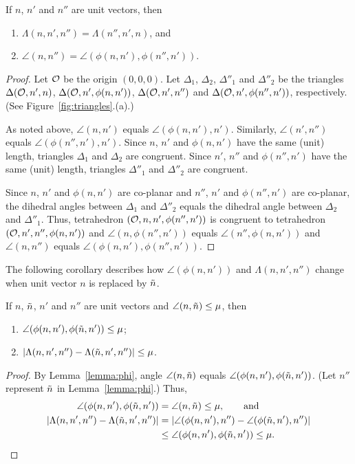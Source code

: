\begin{lemma}
If $n$, $n'$ and $n''$ are unit vectors, then
\begin{enumerate}
\item $\Lambda(n,n',n'') = \Lambda(n'',n',n)$, and
\item $\angle(n,n'') = \angle(\phi(n,n'),\phi(n'',n'))$.
\end{enumerate}
\label{lemma:phi}
\end{lemma}

\begin{proof}
Let $\mathcal{O}$ be the origin $(0,0,0)$.
Let $\Delta_1$, $\Delta_2$, $\Delta''_1$ and $\Delta''_2$
be the triangles $\Delta(\mathcal{O},n',n)$, $\Delta(\mathcal{O},n',\phi(n,n'))$,
$\Delta(\mathcal{O},n',n'')$ and $\Delta(\mathcal{O},n',\phi(n'',n'))$, respectively.
(See Figure~\ref{fig:triangles}.(a).)

As noted above, $\angle(n,n')$ equals $\angle(\phi(n,n'),n')$.
Similarly, $\angle(n',n'')$ equals $\angle(\phi(n'',n'), n')$.
Since $n$, $n'$ and  $\phi(n,n')$ have the same (unit) length,
triangles $\Delta_1$ and $\Delta_2$ are congruent.
Since $n'$, $n''$ and  $\phi(n'',n')$ have the same (unit) length,
triangles $\Delta''_1$ and $\Delta''_2$ are congruent.

Since $n$, $n'$ and $\phi(n,n')$ are co-planar
and $n''$, $n'$ and $\phi(n'',n')$ are co-planar,
the dihedral angles between $\Delta_1$ and $\Delta''_2$ 
equals the dihedral angle between $\Delta_2$ and $\Delta''_1$.
Thus, tetrahedron $(\mathcal{O},n,n',\phi(n'',n'))$ is congruent
to tetrahedron $(\mathcal{O},n',n'',\phi(n,n'))$
and $\angle(n, \phi(n'',n'))$ equals $\angle(n'', \phi(n,n'))$
and $\angle(n,n'')$ equals $\angle(\phi(n,n'),\phi(n'',n'))$.
\end{proof}

The following corollary describes how $\angle(\phi(n,n'))$
and $\Lambda(n,n',n'')$ change when unit vector $n$ is replaced by $\tilde{n}$.
\begin{corollary}
If $n$, $\tilde{n}$, $n'$ and $n''$ are unit vectors
and $\angle(n,\tilde{n}) \le \mu$, then
\begin{enumerate}
\item $\angle(\phi(n,n'),\phi(\tilde{n},n')) \le \mu$;
\item $|\Lambda(n,n',n'') - \Lambda(\tilde{n},n',n'')| \le \mu$.
\end{enumerate}
\label{corollary:phi}
\end{corollary}

\begin{proof}
By Lemma~\ref{lemma:phi},
angle $\angle(n,\tilde{n})$ equals $\angle(\phi(n,n'), \phi(\tilde{n},n'))$.
(Let $n''$ represent $\tilde{n}$ in Lemma~\ref{lemma:phi}.)
Thus,
\begin{align*}
\angle(\phi(n,n'),\phi(\tilde{n},n')) & = \angle(n,\tilde{n}) \le \mu, \qquad \mbox{and} \\
|\Lambda(n,n',n'') - \Lambda(\tilde{n},n',n'')| & = 
|\angle(\phi(n,n'),n'') - \angle(\phi(\tilde{n},n'),n'')|  \\
  & \le \angle(\phi(n,n'),\phi(\tilde{n},n')) \le \mu.
\end{align*}
\end{proof}

